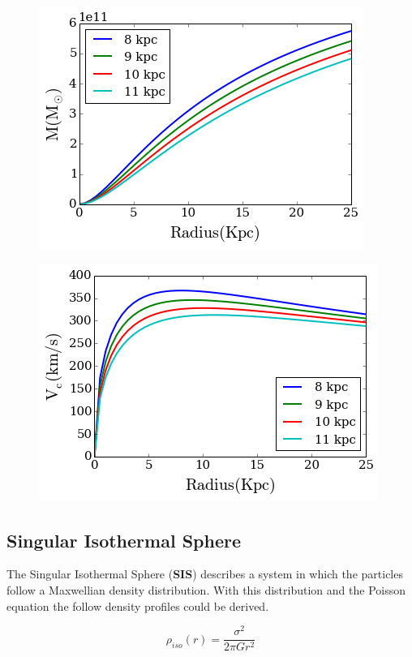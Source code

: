 \documentclass[a4paper, 12pt]{article} %
\begin{document}
\begin{figure}[H]
\centering
\includegraphics[scale=0.7]{hern_mass.png}
\end{figure}

\begin{figure}[H]
\centering
\includegraphics[scale=0.7]{hern_velocity.png}
\end{figure}


\subsection{Singular Isothermal Sphere}

The Singular Isothermal Sphere (\textbf{SIS}) describes a system in which the particles follow
a Maxwellian density distribution. With this distribution and the Poisson equation the follow
density profiles could be derived.


\begin{equation}
\rho_{iso}(r) = \dfrac{\sigma ^2}{2\pi G r^2}
\end{equation}
\end{document}
